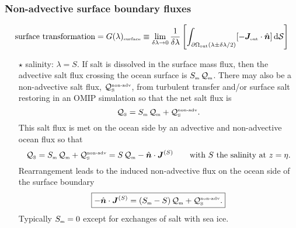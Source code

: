 \documentclass[10pt]{beamer}
\begin{document}
\begin{frame}
  \frametitle{Non-advective surface boundary fluxes}
\tiny 

\begin{exampleblock}{}
 
\begin{equation*}
\mbox{surface transformation}
 = 
 G(\lambda)_{\mbox{\tiny surface}}  
\equiv 
\lim_{\delta \lambda \rightarrow 0}
 \frac{1}{\delta \lambda}
 \left[ \int_{\partial \Omega_{\mbox{\tiny out}} (\lambda \pm \delta \lambda/2)} 
 [-{\bm J}_{\mbox{\tiny out}} \cdot \hat{\bm n}] \, \mathrm{d}\mathcal{S}
  \right]
\end{equation*}

\end{exampleblock}


\begin{itemize}

\item[$\star$] {\sc salinity}: $\lambda = S$.  If salt is dissolved in
  the surface mass flux, then the advective salt flux crossing the
  ocean surface is
  $S_{\mbox{\tiny m}} \, \mathcal{Q}_{\mbox{\tiny m}}$.  There may
  also be a non-advective salt flux,
  $\mathcal{Q}_{\mbox{\tiny S}}^{\mbox{\tiny non-adv}}$, from
  turbulent transfer and/or surface salt restoring in an OMIP
  simulation so that the net salt flux is
\begin{equation*} 
   \mathcal{Q}_{\mbox{\tiny S}} = S_{\mbox{\tiny m}} \,
  \mathcal{Q}_{\mbox{\tiny m}} + \mathcal{Q}_{\mbox{\tiny S}}^{\mbox{\tiny non-adv}}.
\end{equation*}
This salt flux is met on the ocean side by an advective and
non-advective ocean flux so that
\begin{equation*}
  \mathcal{Q}_{\mbox{\tiny S}} = 
   S_{\mbox{\tiny m}} \, \mathcal{Q}_{\mbox{\tiny m}} 
+ \mathcal{Q}_{\mbox{\tiny S}}^{\mbox{\tiny non-adv}} 
= S \, \mathcal{Q}_{\mbox{\tiny  m}} - \hat{\bm n} \cdot {\bm J}^{(S)}
\qquad \mbox{with $S$ the salinity at $z=\eta$.}
\end{equation*}
Rearrangement leads to the induced non-advective flux on the ocean
side of the surface boundary
\begin{equation*}
\boxed{
  -\hat{\bm n} \cdot {\bm J}^{(S)} =
 (S_{\mbox{\tiny m}} - S) \, \mathcal{Q}_{\mbox{\tiny m}} + \mathcal{Q}_{\mbox{\tiny S}}^{\mbox{\tiny non-adv}}.
}
 \end{equation*}
 Typically $S_{\mbox{\tiny m}} =0$ except for exchanges of salt with
 sea ice.


\end{itemize}
\end{frame}
\end{document}
